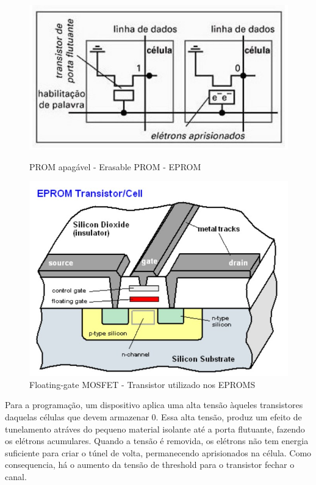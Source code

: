 \documentclass{article}
\begin{document}
 
\begin{figure}[h]
\centering
\begin{minipage}{0.48\textwidth}
    \centering
    \includegraphics[width=\linewidth]{estruturaEPROM.jpg}
    \caption{PROM apagável - Erasable PROM - EPROM}
    \label{fig:EPROM}
\end{minipage}\hfill
\begin{minipage}{0.48\textwidth}
    \centering
    \includegraphics[width=\linewidth]{EPROMS2.jpg}
    \caption{Floating-gate MOSFET - Transistor utilizado nos EPROMS}
    \label{fig:transistorEprom}
\end{minipage}
\end{figure}

Para a programação, um dispositivo aplica uma alta tensão àqueles transistores daquelas células que devem armazenar $0$. Essa alta tensão, produz um efeito de tunelamento atráves do pequeno material isolante até a porta flutuante, fazendo os elétrons acumulares. Quando a tensão é removida, os elétrons não tem energia suficiente para criar o túnel de volta, permanecendo aprisionados na célula. Como consequencia, há o aumento da tensão de threshold para o transistor fechar o canal.
\end{document}
